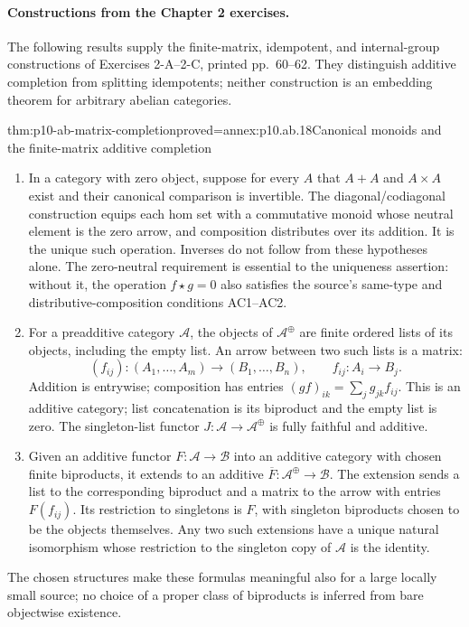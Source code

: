 \paragraph{Constructions from the Chapter 2 exercises.}
The following results supply the finite-matrix, idempotent, and internal-group
constructions of Exercises 2-A--2-C, printed pp.~60--62. They distinguish
additive completion from splitting idempotents; neither construction is
an embedding theorem for arbitrary abelian categories.

\begin{hbtheorem}{thm:p10-ab-matrix-completion}{proved=annex:p10.ab.18}{Canonical monoids and the finite-matrix additive completion}
\begin{enumerate}
\item In a category with zero object, suppose for every \(A\) that
\(A+A\) and \(A\times A\) exist and their canonical comparison
is invertible. The diagonal/codiagonal construction equips each hom set
with a commutative monoid whose neutral element is the zero arrow, and
composition distributes over its addition. It is the unique such
operation. Inverses do not follow from these hypotheses alone.
The zero-neutral requirement is essential to the uniqueness assertion:
without it, the operation \(f\star g=0\) also satisfies the source's
same-type and distributive-composition conditions AC1--AC2.
\item For a preadditive category \(\mathcal A\), the objects of
\(\mathcal A^{\oplus}\) are finite ordered lists of its objects,
including the empty list. An arrow between two such lists is a matrix:
\[
 (f_{ij}):(A_1,\ldots,A_m)\longrightarrow(B_1,\ldots,B_n),
 \qquad f_{ij}:A_i\to B_j.
\]
Addition is entrywise; composition has entries
\((gf)_{ik}=\sum_j g_{jk}f_{ij}\). This is an additive category;
list concatenation is its biproduct and the empty list is zero.
The singleton-list functor \(J:\mathcal A\to\mathcal A^{\oplus}\)
is fully faithful and additive.
\item Given an additive functor \(F:\mathcal A\to\mathcal B\)
into an additive category with chosen finite biproducts, it extends to
an additive \(\overline F:\mathcal A^{\oplus}\to\mathcal B\).
The extension sends a list to the corresponding biproduct and a matrix
to the arrow with entries \(F(f_{ij})\). Its restriction to singletons
is \(F\), with singleton biproducts chosen to be the objects themselves.
Any two such extensions have a unique natural isomorphism whose restriction
to the singleton copy of \(\mathcal A\) is the identity.
\end{enumerate}
The chosen structures make these formulas meaningful also for a large
locally small source; no choice of a proper class of biproducts is inferred
from bare objectwise existence.
\end{hbtheorem}

